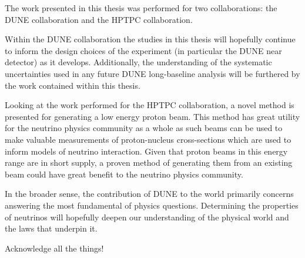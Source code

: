\begin{impactstatement}

The work presented in this thesis was performed for two collaborations: the DUNE collaboration and the HPTPC collaboration.

Within the DUNE collaboration the studies in this thesis will hopefully continue to inform the design choices of the experiment (in particular the DUNE near detector) as it develops. 
Additionally, the understanding of the systematic uncertainties used in any future DUNE long-baseline analysis will be furthered by the work contained within this thesis.

Looking at the work performed for the HPTPC collaboration, a novel method is presented for generating a low energy proton beam.
This method has great utility for the neutrino physics community as a whole as such beams can be used to make valuable measurements of proton-nucleus cross-sections which are used to inform models of neutrino interaction.
Given that proton beams in this energy range are in short supply, a proven method of generating them from an existing beam could have great benefit to the neutrino physics community.

In the broader sense, the contribution of DUNE to the world primarily concerns answering the most fundamental of physics questions.
Determining the properties of neutrinos will hopefully deepen our understanding of the physical world and the laws that underpin it.

\end{impactstatement}

\begin{acknowledgements}
Acknowledge all the things!
\end{acknowledgements}

\setcounter{tocdepth}{2} 

\tableofcontents
\listoffigures
\listoftables

